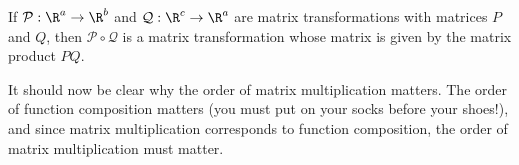 \begin{theorem}
	If $\mathcal P:\R^a\to\R^b$ and $\mathcal Q:\R^c\to \R^a$ are matrix transformations with matrices 
	$P$ and $Q$, then $\mathcal P\circ \mathcal Q$ is a matrix transformation whose matrix is given
	by the matrix product $PQ$.
\end{theorem}

It should now be clear why the order of matrix multiplication matters. The order of function composition
matters (you must put on your socks before your shoes!), and since matrix multiplication corresponds
to function composition, the order of matrix multiplication must matter.
